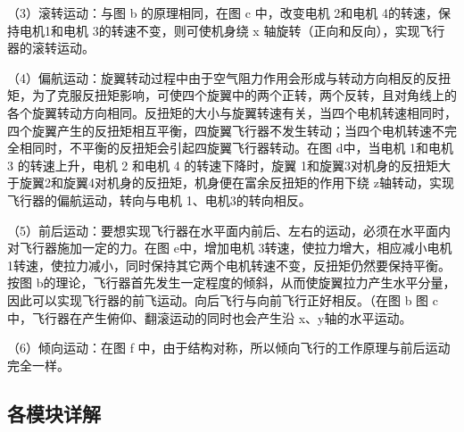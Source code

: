\documentclass{ctexart}
\begin{document}
（3）滚转运动：与图 b 的原理相同，在图 c 中，改变电机 2和电机 4的转速，保持电机1和电机 3的转速不变，则可使机身绕 x 轴旋转（正向和反向），实现飞行器的滚转运动。\par
（4）偏航运动：旋翼转动过程中由于空气阻力作用会形成与转动方向相反的反扭矩，为了克服反扭矩影响，可使四个旋翼中的两个正转，两个反转，且对角线上的各个旋翼转动方向相同。反扭矩的大小与旋翼转速有关，当四个电机转速相同时，四个旋翼产生的反扭矩相互平衡，四旋翼飞行器不发生转动；当四个电机转速不完全相同时，不平衡的反扭矩会引起四旋翼飞行器转动。在图 d中，当电机 1和电机 3 的转速上升，电机 2 和电机 4 的转速下降时，旋翼 1和旋翼3对机身的反扭矩大于旋翼2和旋翼4对机身的反扭矩，机身便在富余反扭矩的作用下绕 z轴转动，实现飞行器的偏航运动，转向与电机 1、电机3的转向相反。\par
（5）前后运动：要想实现飞行器在水平面内前后、左右的运动，必须在水平面内对飞行器施加一定的力。在图 e中，增加电机 3转速，使拉力增大，相应减小电机 1转速，使拉力减小，同时保持其它两个电机转速不变，反扭矩仍然要保持平衡。按图 b的理论，飞行器首先发生一定程度的倾斜，从而使旋翼拉力产生水平分量，因此可以实现飞行器的前飞运动。向后飞行与向前飞行正好相反。（在图 b 图 c中，飞行器在产生俯仰、翻滚运动的同时也会产生沿 x、y轴的水平运动。\par
（6）倾向运动：在图 f 中，由于结构对称，所以倾向飞行的工作原理与前后运动完全一样。\par
\subsection{各模块详解}
\end{document}

